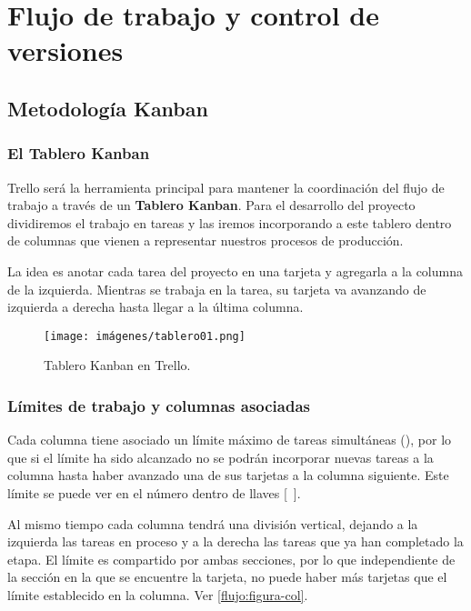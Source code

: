 
\section{Flujo de trabajo y control de versiones}\label{flujo:flujo-de-trabajo}

\subsection{Metodología Kanban}\label{flujo:metodologia-kanban}
\subsubsection{El Tablero Kanban}\label{flujo:tablero-kanban}
Trello será la herramienta principal para mantener la coordinación del flujo de trabajo a través de un \textbf{Tablero Kanban}. Para el desarrollo del proyecto dividiremos el trabajo en tareas y las iremos incorporando a este tablero dentro de columnas que vienen a representar nuestros procesos de producción.

La idea es anotar cada tarea del proyecto en una tarjeta y agregarla a la columna de la izquierda. Mientras se trabaja en la tarea, su tarjeta va avanzando de izquierda a derecha hasta llegar a la última columna.  

\begin{figure}[h]
	\centering
	\texttt{[image: imágenes/tablero01.png]}
	\caption{Tablero Kanban en Trello.}
\end{figure}

\subsubsection{Límites de trabajo y columnas asociadas}\label{flujo:limites-de-trabajo}
Cada columna tiene asociado un límite máximo de tareas simultáneas (), por lo que si el límite ha sido alcanzado no se podrán incorporar nuevas tareas a la columna hasta haber avanzado una de sus tarjetas a la columna siguiente. Este límite se puede ver en el número dentro de llaves [~].

Al mismo tiempo cada columna tendrá una división vertical, dejando a la izquierda las tareas en proceso y a la derecha las tareas que ya han completado la etapa. El límite es compartido por ambas secciones, por lo que independiente de la sección en la que se encuentre la tarjeta, no puede haber más tarjetas que el límite establecido en la columna. Ver \autoref{flujo:figura-col}.

